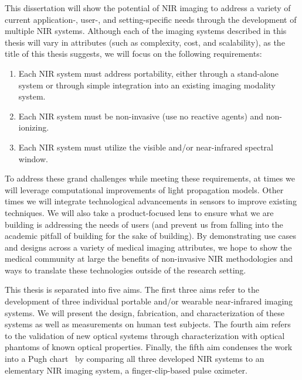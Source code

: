 This dissertation will show the potential of NIR imaging to address a variety of current application-, user-, and setting-specific needs through the development of multiple \ac{NIR} systems. Although each of the imaging systems described in this thesis will vary in attributes (such as complexity, cost, and scalability), as the title of this thesis suggests, we will focus on the following requirements:
\begin{enumerate}
  \item Each NIR system must address portability, either through a stand-alone system or through simple integration into an existing imaging modality system. 
  \item Each NIR system must be non-invasive (use no reactive agents) and non-ionizing.
  \item Each NIR system must utilize the visible and/or near-infrared spectral window.
\end{enumerate}

To address these grand challenges while meeting these requirements, at times we will leverage computational improvements of light propagation models. Other times we will integrate technological advancements in sensors to improve existing techniques. We will also take a product-focused lens to ensure what we are building is addressing the needs of users (and prevent us from falling into the academic pitfall of building for the sake of building). By demonstrating use cases and designs across a variety of medical imaging attributes, we hope to show the medical community at large the benefits of non-invasive NIR methodologies and ways to translate these technologies outside of the research setting. 

This thesis is separated into five aims. The first three aims refer to the development of three individual portable and/or wearable near-infrared imaging systems. We will present the design, fabrication, and characterization of these systems as well as measurements on human test subjects. The fourth aim refers to the validation of new optical systems through characterization with optical phantoms of known optical properties. Finally, the fifth aim condenses the work into a Pugh chart~\cite{Pugh1981} by comparing all three developed NIR systems to an elementary NIR imaging system, a finger-clip-based pulse oximeter. 

